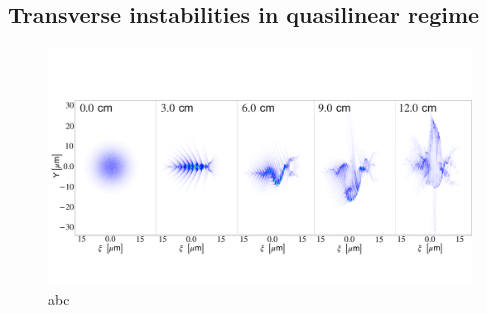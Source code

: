 \subsection{Transverse instabilities in quasilinear regime}
\begin{figure}
\centering
\includegraphics[width=\textwidth]{CherenkovInstability}
\caption{abc}
\end{figure}


